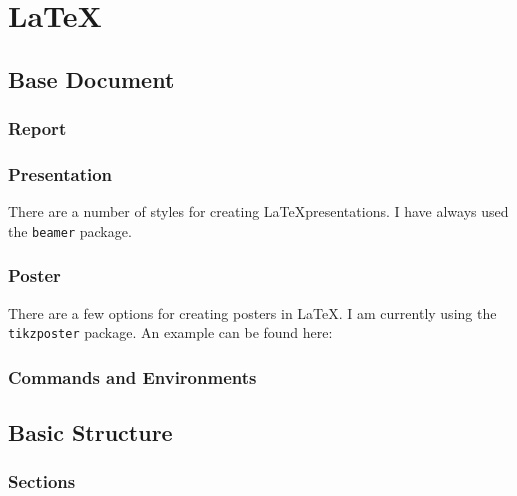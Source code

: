 \chapter{\LaTeX}
\label{latex}

\section{Base Document}


\subsection{Report}
\subsection{Presentation}

There are a number of styles for creating \LaTeX presentations. I have always used the \texttt{beamer} package.


\subsection{Poster}

There are a few options for creating posters in \LaTeX. I am currently using the \texttt{tikzposter} package. An example can be found here:


\subsection{Commands and Environments}



\section{Basic Structure}
\subsection{Sections}

